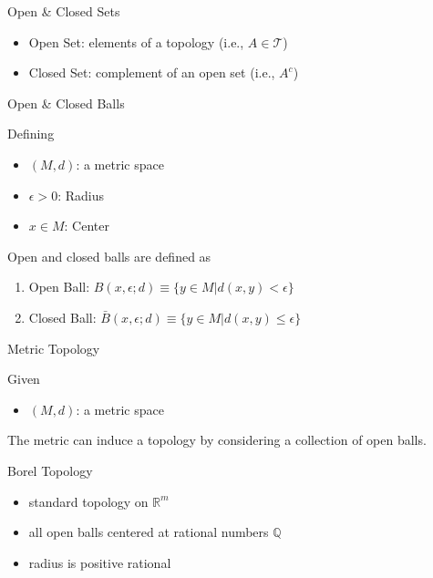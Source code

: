 \begin{definition}{Open \& Closed Sets}

    \begin{itemize}
        \item Open Set: elements of a topology (i.e., $A \in \mathcal{T}$)
        \item Closed Set: complement of an open set (i.e., $A^c$)
    \end{itemize}
    
\end{definition}

\begin{definition}{Open \& Closed Balls}

    Defining
    \begin{itemize}
        \item $(M,d)$: a metric space
        \item $\epsilon > 0$: Radius
        \item $x \in M$: Center
    \end{itemize}
    Open and closed balls are defined as
    \begin{enumerate}
        \item Open Ball: $B(x,\epsilon;d) \equiv \{y \in M | d(x,y) < \epsilon\}$
        \item Closed Ball: $\bar{B}(x,\epsilon;d) \equiv \{y \in M | d(x,y) \le \epsilon\}$
    \end{enumerate}
    
\end{definition}

\begin{definition}{Metric Topology}
    
    Given
    \begin{itemize}
        \item $(M,d)$: a metric space
    \end{itemize}
    The metric can induce a topology by considering a collection of open balls.

    \begin{example}{Borel Topology}

        \begin{itemize}
            \item standard topology on $\mathbb{R}^m$
            \item all open balls centered at rational numbers $\mathbb{Q}$
            \item radius is positive rational
        \end{itemize}
    \end{example}

\end{definition}

